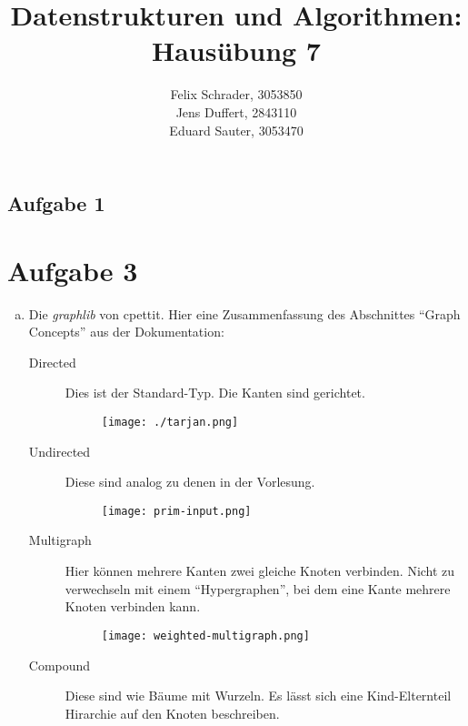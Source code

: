\documentclass[11pt]{article}
\author{
  Felix Schrader, 3053850 \\ 
  Jens Duffert, 2843110 \\
  Eduard Sauter, 3053470
}
\title{Datenstrukturen und Algorithmen: Haus\"ubung 7}
\begin{document}
\maketitle
\subsection*{Aufgabe 1}
  


  \newpage
\section*{Aufgabe 3}
\begin{enumerate}[a)]

  \item Die \emph{graphlib} von cpettit. Hier eine Zusammenfassung des
    Abschnittes ``Graph Concepts'' aus der Dokumentation:
    \begin{description}
      \item[Directed] 
        Dies ist der Standard-Typ. Die Kanten sind gerichtet.

        \begin{figure}[h!]
          \centering
          \texttt{[image: ./tarjan.png]}
          \label{fig:}
        \end{figure}

      \item[Undirected]
        Diese sind analog zu denen in der Vorlesung.

        \begin{figure}[h!]
          \centering
          \texttt{[image: prim-input.png]}
          \label{fig:input}
        \end{figure}

      \item[Multigraph]
        Hier k\"onnen mehrere Kanten zwei gleiche Knoten verbinden. Nicht
        zu verwechseln mit einem ``Hypergraphen'', bei dem eine Kante mehrere
        Knoten verbinden kann.

        \begin{figure}[h!]
          \centering
          \texttt{[image: weighted-multigraph.png]}
          \label{fig:multigraph}
        \end{figure}

      \item[Compound]
        Diese sind wie B\"aume mit Wurzeln. Es l\"asst sich eine Kind-Elternteil
        Hirarchie auf den Knoten beschreiben.


\end{description}
\end{enumerate}
\end{document}

